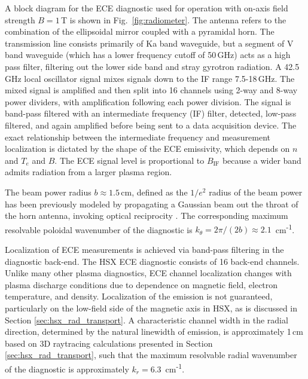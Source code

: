 \documentclass[%
 aip,
 amsmath,amssymb,
 reprint,%
]{revtex4-1}
\begin{document}
A block diagram for the ECE diagnostic used for operation with on-axis field strength $B=1$\,T is shown in Fig.\ \ref{fig:radiometer}. The antenna refers to the combination of the ellipsoidal mirror coupled with a pyramidal horn. The transmission line consists primarily of Ka band waveguide, but a segment of V band waveguide (which has a lower frequency cutoff of 50\,GHz) acts as a high pass filter, filtering out the lower side band and stray gyrotron radiation. A 42.5\,GHz local oscillator signal mixes signals down to the IF range 7.5-18\,GHz. The mixed signal is amplified and then split into 16 channels using 2-way and 8-way power dividers, with amplification following each power division. The signal is band-pass filtered with an intermediate frequency (IF) filter, detected, low-pass filtered, and again amplified before being sent to a data acquisition device. The exact relationship between the intermediate frequency and measurement localization is dictated by the shape of the ECE emissivity, which depends on $n$ and $T_e$ and $B$. The ECE signal level is proportional to $B_\mathrm{IF}$ because a wider band admits radiation from a larger plasma region.


 The beam power radius $b \approx 1.5$\,cm, defined as the $1/e^2$ radius of the beam power has been previously modeled by propagating a Gaussian beam out the throat of the horn antenna, invoking optical reciprocity \cite{weir-thesis}. The corresponding maximum resolvable poloidal wavenumber of the diagnostic is $k_\theta = 2 \pi / (2 b) \approx 2.1$ \,cm\textsuperscript{-1}.

Localization of ECE measurements is achieved via band-pass filtering in the diagnostic back-end. The HSX ECE diagnostic consists of 16 back-end channels.  Unlike many other plasma diagnostics, ECE channel localization changes with plasma discharge conditions due to dependence on magnetic field, electron temperature, and density. Localization of the emission is not guaranteed, particularly on the low-field side of the magnetic axis in HSX, as is discussed in Section \ref{sec:hsx_rad_transport}. A characteristic channel width in the radial direction, determined by the natural linewidth of emission, is approximately 1\,cm based on 3D raytracing calculations presented in Section \ref{sec:hsx_rad_transport}, such that the maximum resolvable radial wavenumber of the diagnostic is approximately $k_r = 6.3$ \,cm\textsuperscript{-1}.
\end{document}

